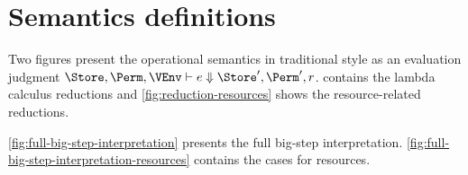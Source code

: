 \section{Semantics definitions}
\label{sec:semant-defin}


 
Two figures present the operational semantics in traditional style as
an evaluation judgment $\Store, \Perm, \VEnv \vdash e \Downarrow
\Store', \Perm', r$. 
 contains the lambda calculus reductions  and
\cref{fig:reduction-resources} shows the resource-related reductions.



\cref{fig:full-big-step-interpretation} presents  the full big-step
interpretation. \cref{fig:full-big-step-interpretation-resources}
contains the cases for resources.

